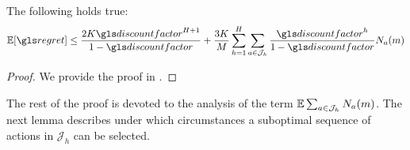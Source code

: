 \begin{lemma}
	\label{lemma:expected-regret}
	\begin{leftbar}[lemmabar]
	The following holds true:
	\begin{equation*}
	\expectedvalue [\regret] \leq \frac{2K \discount^{H+1}}{1-\discount} +\frac{3K}{M}\sum_{h=1}^H\sum_{a\in\mathcal{J}_h}\frac{\discount^h}{1-\discount}N_a(m)
	\end{equation*}
	\end{leftbar}
\end{lemma}
\begin{proof}
	We provide the proof in .
\end{proof}


The rest of the proof is devoted to the analysis of the term $\operatorname*{\mathbb{E}} \sum_{a\in \mathcal{J}_h} N_a(m)$. The next lemma describes under which circumstances a suboptimal sequence of actions in $\mathcal{J}_h$ can be selected.

